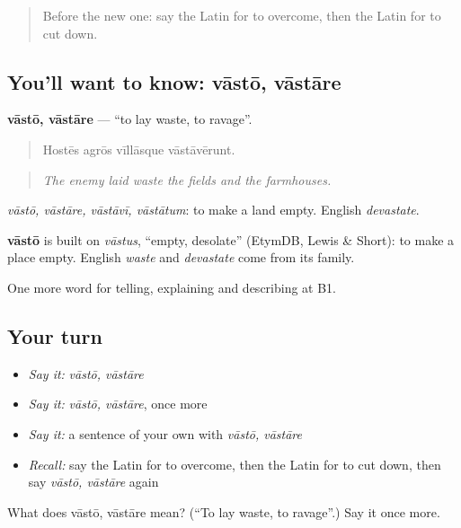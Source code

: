 \begin{quote}
Before the new one: say the Latin for to overcome, then the Latin for to cut down.
\end{quote}

\subsection*{You'll want to know: vāstō, vāstāre}
\textbf{vāstō, vāstāre} — \textquotedblleft{}to lay waste, to ravage\textquotedblright{}.

\begin{quote}
Hostēs agrōs vīllāsque vāstāvērunt.
\end{quote}

\begin{quote}
\emph{The enemy laid waste the fields and the farmhouses.}
\end{quote}

\emph{vāstō, vāstāre, vāstāvī, vāstātum}: to make a land empty. English \emph{devastate}.

\begin{cousinweb}
\textbf{vāstō} is built on \emph{vāstus}, \textquotedblleft{}empty, desolate\textquotedblright{} (EtymDB, Lewis \& Short): to make a place empty. English \emph{waste} and \emph{devastate} come from its family.
\end{cousinweb}

\begin{grammarlens}[title={What you've built}]
One more word for telling, explaining and describing at B1.
\end{grammarlens}

\subsection*{Your turn}
\begin{itemize}
\raggedright
  \item \emph{Say it:} \emph{vāstō, vāstāre}
  \item \emph{Say it:} \emph{vāstō, vāstāre}, once more
  \item \emph{Say it:} a sentence of your own with \emph{vāstō, vāstāre}
  \item \emph{Recall:} say the Latin for to overcome, then the Latin for to cut down, then say \emph{vāstō, vāstāre} again
\end{itemize}

\begin{tcolorbox}[breakable,colback=teal!4,colframe=teal!35!black,title={Before you move on}]
What does vāstō, vāstāre mean? (\textquotedblleft{}To lay waste, to ravage\textquotedblright{}.) Say it once more.
\end{tcolorbox}

